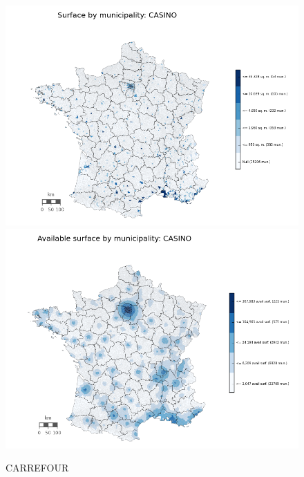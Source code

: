 \documentclass[11pt]{article}
\begin{document}
\begin{figure}[H]
    \caption{CARREFOUR}
	\centering
		\includegraphics[width=15cm]{images/maps_surface/CASINO.png}
        \includegraphics[width=15cm]{images/maps_available_surface/CASINO.png}
\end{figure}
\end{document}
